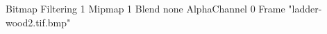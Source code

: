 {Bitmap
	{Filtering 1}
	{Mipmap 1}
	{Blend none}
	{AlphaChannel 0}
	{Frame "ladder-wood2.tif.bmp"}
}
